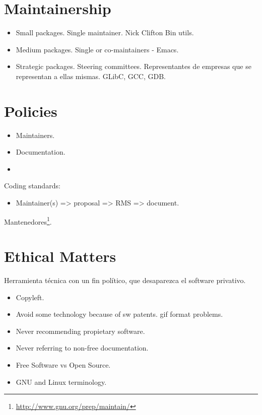 \documentclass[11pt]{scrartcl}
\begin{document}
\section{Maintainership}
\label{sec:maintainership}

\begin{itemize}
	\item Small packages. Single maintainer. Nick Clifton Bin utils.
	\item Medium packages. Single or co-maintainers - Emacs.
	\item Strategic packages. Steering committees. Representantes de empresas que se representan a ellas mismas. GLibC, GCC, GDB.
\end{itemize}


\section{Policies}
\label{sec:policies}

\begin{itemize}
	\item Maintainers.
	\item Documentation.
	\item 
\end{itemize}

Coding standards: 

\begin{itemize}
	\item Maintainer(s) => proposal => RMS => document.
\end{itemize}

Mantenedores\footnote{\url{http://www.gnu.org/prep/maintain/}}.


\section{Ethical Matters}
\label{sec:ethical}

Herramienta t\'ecnica con un fin pol\'itico, que desaparezca el software privativo.

\begin{itemize}
	\item Copyleft.
	\item Avoid some technology because of sw patents. gif format problems.
	\item Never recommending propietary software.
	\item Never referring to non-free documentation.
	\item Free Software vs Open Source.
	\item GNU and Linux terminology.
\end{itemize}
\end{document}
